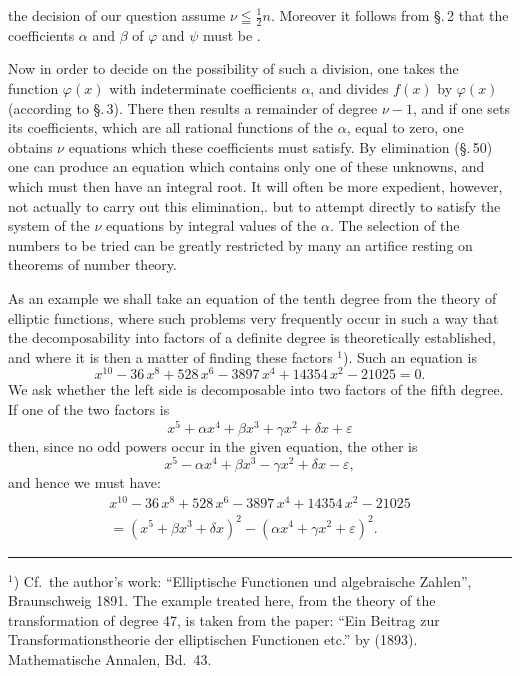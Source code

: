 the decision of our question assume $\nu\leqq\frac{1}{2}n$. Moreover it
follows from \S.\,2 that the coefficients $\alpha$ and $\beta$ of $\varphi$ and $\psi$
must be .

Now in order to decide on the possibility of such a division, one
takes the function $\varphi(x)$ with indeterminate
coefficients $\alpha$, and divides $f(x)$ by $\varphi(x)$ (according to \S.\,3). There
then results a remainder of degree $\nu-1$, and if one sets its
coefficients, which are all rational functions of the $\alpha$,
equal to zero, one obtains $\nu$ equations which these
coefficients must satisfy. By elimination (\S.\,50) one can
produce an equation which contains only one of these unknowns,
and which must then have an integral root. It
will often be more expedient, however, not actually to carry out this
elimination,. but to attempt directly to satisfy the system of the %
$\nu$ equations by integral values of the $\alpha$. The
selection of the numbers to be tried can be greatly restricted by many
an artifice resting on theorems of number theory.

As an example we shall take an equation of the tenth degree
from the theory of elliptic functions, where
such problems very frequently occur in such a way that the
decomposability into factors of a definite degree is theoretically established,
and where it is then a matter of finding these
factors $^1$). Such an equation is
\[
x^{10} - 36\,x^8 + 528\,x^6 - 3897\,x^4 + 14354\,x^2 - 21025 = 0.
\]
We ask whether the left side is decomposable into two factors of the
fifth degree. If one of the two factors is
\[
x^5 + \alpha x^4 + \beta x^3 + \gamma x^2 + \delta x + \varepsilon
\]
then, since no odd powers occur in the given equation,
the other is
\[
x^5 - \alpha x^4 + \beta x^3 - \gamma x^2 + \delta x - \varepsilon,
\]
and hence we must have:
\[
\begin{aligned}
x^{10} - 36\,x^8 + 528\,x^6 - 3897\,x^4 + 14354\,x^2 - 21025 \\
= (x^5 + \beta x^3 + \delta x)^2 - (\alpha x^4 + \gamma x^2 + \varepsilon)^2.
\end{aligned}
\]

\noindent\rule{4cm}{0.4pt}

$^1$) Cf.\ the author's work: ``Elliptische Functionen und algebraische
Zahlen'', Braunschweig 1891. The example treated here, from the theory
of the transformation of degree 47, is taken from the paper: ``Ein
Beitrag zur Transformationstheorie der elliptischen Functionen etc.'' by
 (1893). Mathematische Annalen, Bd.\ 43.
